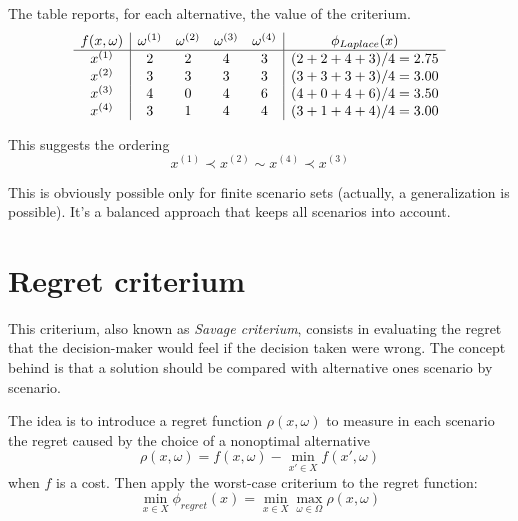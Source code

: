 The table reports, for each alternative, the value of the criterium.
$$
\begin{array}{c|cccc | c}
	f(x,\omega) & \omega^{(1)} & \omega^{(2)} & \omega^{(3)} & \omega^{(4)}  & \phi_{Laplace} (x)\\
	\hline
	x^{(1)} & 2 & 2 & 4 & 3 & (2+2+4+3)/4 = 2.75 \\
	x^{(2)} & 3 & 3 & 3 & 3 & (3+3+3+3)/4 = 3.00 \\
	x^{(3)} & 4 & 0 & 4 & 6 & (4+0+4+6)/4 = 3.50 \\
	x^{(4)} & 3 & 1 & 4 & 4 & (3+1+4+4)/4 = 3.00 \\
\end{array}
$$

This suggests the ordering
$$ x^{(1)} \prec x^{(2)} \sim x^{(4)} \prec x^{(3)} $$

This is obviously possible only for finite scenario sets (actually, a generalization is possible). It's a balanced approach that keeps all scenarios into account.

\section{Regret criterium}
\label{sec:regret}

This criterium, also known as \textit{Savage criterium}, consists in evaluating the regret that the decision-maker would feel if the decision taken were wrong. The concept behind is that a solution should be compared with alternative ones scenario by scenario.

The idea is to introduce a regret function $\rho (x, \omega)$ to measure in each scenario the regret caused by the choice of a nonoptimal alternative
$$ \rho (x, \omega) = f (x, \omega) - \min_{x' \in X} f (x', \omega) $$
when $f$ is a cost. Then apply the worst-case criterium to the regret function: 
$$ \min_{x \in X} \phi_{regret} (x) = \min_{x \in X} \max_{\omega \in \Omega} \rho (x, \omega) $$

